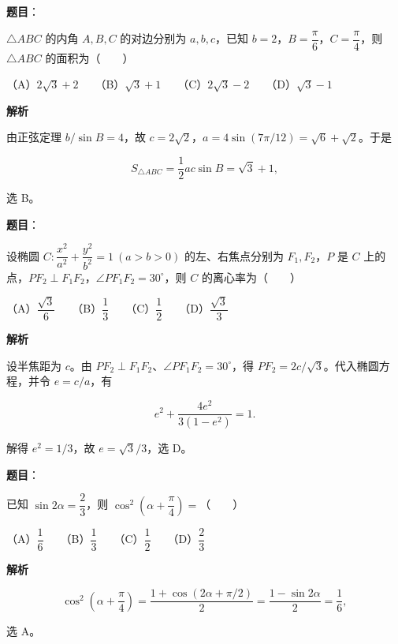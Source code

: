 \begin{answer}

\textbf{题目}：

$\triangle ABC$ 的内角 $A,B,C$ 的对边分别为 $a,b,c$，已知 $b=2$，$B=\dfrac\pi6$，$C=\dfrac\pi4$，则 $\triangle ABC$ 的面积为\mbox{（　　）}

（A）$2\sqrt3+2$　　（B）$\sqrt3+1$　　（C）$2\sqrt3-2$　　（D）$\sqrt3-1$

\textbf{解析}

由正弦定理 $b/\sin B=4$，故 $c=2\sqrt2$，$a=4\sin(7\pi/12)=\sqrt6+\sqrt2$。于是

\nopagebreak[4]
\[S_{\triangle ABC}=\frac12ac\sin B=\sqrt3+1,\]

选 B。


\end{answer}
\begin{answer}

\textbf{题目}：

设椭圆 $C:\dfrac{x^2}{a^2}+\dfrac{y^2}{b^2}=1\ (a>b>0)$ 的左、右焦点分别为 $F_1,F_2$，$P$ 是 $C$ 上的点，$PF_2\perp F_1F_2$，$\angle PF_1F_2=30^\circ$，则 $C$ 的离心率为\mbox{（　　）}

（A）$\dfrac{\sqrt3}{6}$　　（B）$\dfrac13$　　（C）$\dfrac12$　　（D）$\dfrac{\sqrt3}{3}$

\textbf{解析}

设半焦距为 $c$。由 $PF_2\perp F_1F_2$、$\angle PF_1F_2=30^\circ$，得 $PF_2=2c/\sqrt3$。代入椭圆方程，并令 $e=c/a$，有

\nopagebreak[4]
\[e^2+\frac{4e^2}{3(1-e^2)}=1.\]

解得 $e^2=1/3$，故 $e=\sqrt3/3$，选 D。


\end{answer}
\begin{answer}

\textbf{题目}：

已知 $\sin2\alpha=\dfrac23$，则 $\cos^2\left(\alpha+\dfrac\pi4\right)=$\mbox{（　　）}

（A）$\dfrac16$　　（B）$\dfrac13$　　（C）$\dfrac12$　　（D）$\dfrac23$

\textbf{解析}

\nopagebreak[4]
\[\cos^2\left(\alpha+\frac\pi4\right)=\frac{1+\cos(2\alpha+\pi/2)}2=\frac{1-\sin2\alpha}2=\frac16,\]

选 A。


\end{answer}

